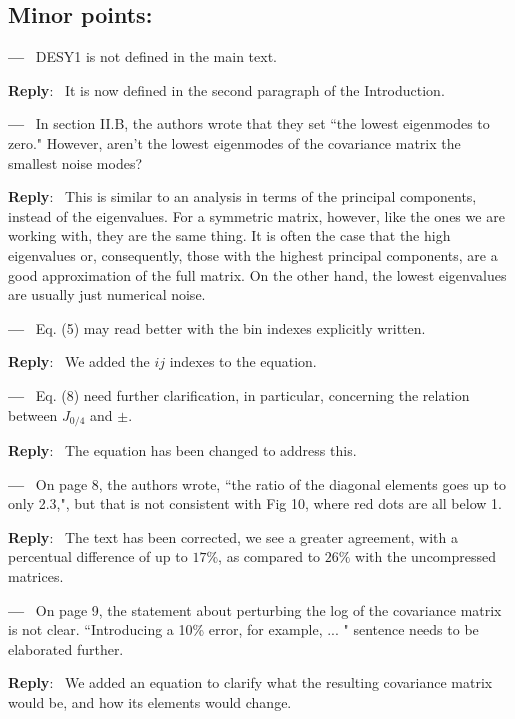 \documentclass[11pt]{article}
\newcommand{\minorpoint}[1]{\bigskip \noindent 
	\textbf{---}\ #1 \par }
\newcommand{\reply}[1]{\medskip \noindent \textbf{Reply}:\ #1 
	\medskip }
\begin{document}
	\subsection*{Minor points:}
	
	\minorpoint{
		DESY1 is not defined in the main text.}
	\reply{
		It is now defined in the second paragraph of the Introduction.}
	
	\minorpoint{
		In section II.B, the authors wrote that they set ``the lowest eigenmodes to zero." However, aren't the lowest eigenmodes of the covariance matrix the smallest noise modes?}
	\reply{
		This is similar to an analysis in terms of the principal components, instead of the eigenvalues. For a symmetric matrix, however, like the ones we are working with, they are the same thing. It is often the case that the high eigenvalues or, consequently, those with the highest principal components, are a good approximation of the full matrix. On the other hand, the lowest eigenvalues are usually just numerical noise.}
	
	\minorpoint{
		Eq. (5) may read better with the bin indexes explicitly written.}
	\reply{
		We added the $ij$ indexes to the equation.}
	
	\minorpoint{
		Eq. (8) need further clarification, in particular, concerning the relation between $J_{0/4}$ and $\pm$.}
	\reply{
		The equation has been changed to address this.}
	
	\minorpoint{
		On page 8, the authors wrote, ``the ratio of the diagonal elements goes up to only 2.3,", but that is not consistent with Fig 10, where red dots are all below 1.}
	\reply{
		The text has been corrected, we see a greater agreement, with a percentual difference of up to $17\%$, as compared to $26\%$ with the uncompressed matrices.}
	
	\minorpoint{
		On page 9, the statement about perturbing the log of the covariance matrix is not clear. ``Introducing a 10\% error, for example, ... " sentence needs to be elaborated further.}
	\reply{
		We added an equation to clarify what the resulting covariance matrix would be, and how its elements would change.}
	
\end{document}
